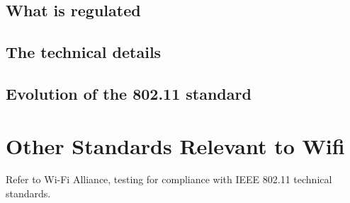 \subsection{What is regulated}

\subsection{The technical details}

\subsection{Evolution of the 802.11 standard}

\section{Other Standards Relevant to Wifi}

Refer to Wi-Fi Alliance, testing for compliance with IEEE 802.11 technical standards.